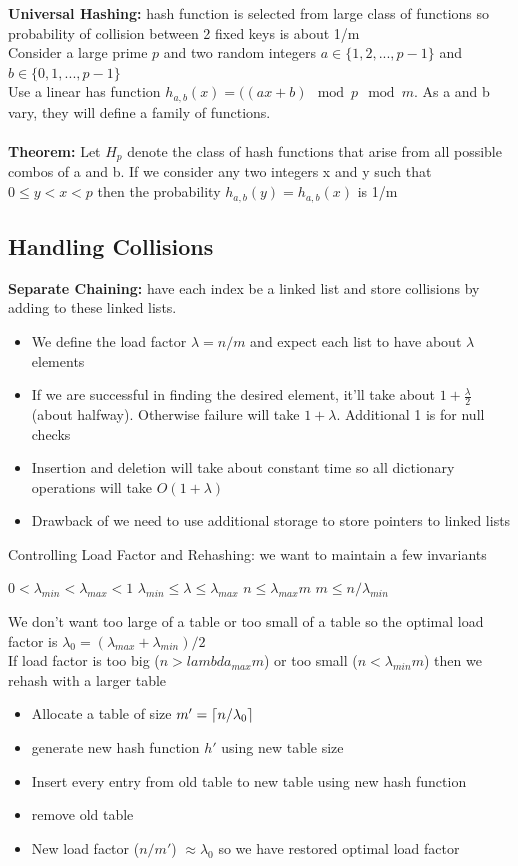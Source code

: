 \documentclass{article}
\DeclarePairedDelimiter{\ceil}{\lceil}{\rceil}
\begin{document}
  \textbf{Universal Hashing: }hash function is selected from large class of functions so probability of collision between 2 fixed keys is about 1/m\\
  Consider a large prime $p$ and two random integers $a \in \{1, 2, ..., p-1\}$ and $b \in \{0, 1, ..., p-1\}$ \\
  Use a linear has function $h_{a,b}(x) = ((ax + b) \mod p \mod m$. As a and b vary, they will define a family of functions.\\ \\
  \textbf{Theorem: }Let $H_{p}$ denote the class of hash functions that arise from all possible combos of a and b. If we consider any two integers x and y such that $0 \leq y < x < p$ then the probability $h_{a,b}(y) = h_{a,b}(x)$ is 1/m
  \subsection{Handling Collisions}
  \textbf{Separate Chaining: }have each index be a linked list and store collisions by adding to these linked lists.
    \begin{itemize}[noitemsep]
    \item We define the load factor $\lambda = n/m$ and expect each list to have about $\lambda$ elements
    \item If we are successful in finding the desired element, it'll take about $1 + \frac{\lambda}{2}$ (about halfway). Otherwise failure will take $1 + \lambda$. Additional 1 is for null checks
    \item Insertion and deletion will take about constant time so all dictionary operations will take $O(1 + \lambda)$
    \item Drawback of we need to use additional storage to store pointers to linked lists
    \end{itemize}
  Controlling Load Factor and Rehashing: we want to maintain a few invariants
  \begin{center} 
    $0 < \lambda_{min} < \lambda_{max} < 1$ \quad $\lambda_{min} \leq \lambda \leq \lambda_{max}$ \quad $n \leq \lambda_{max}m$ \quad $m \leq n/\lambda_{min}$
  \end{center}
  We don't want too large of a table or too small of a table so the optimal load factor is $\lambda_{0} = (\lambda_{max} + \lambda_{min}) / 2$\\
  If load factor is too big ($n > lambda_{max}m$) or too small ($n < \lambda_{min}m$) then we rehash with a larger table
  \begin{itemize}
    \item Allocate a table of size $m' = \ceil{n/\lambda_{0}}$
    \item generate new hash function $h'$ using new table size
    \item Insert every entry from old table to new table using new hash function
    \item remove old table
    \item New load factor ($n/m'$) $\approx \lambda_{0}$ so we have restored optimal load factor
  \end{itemize}
\end{document}
